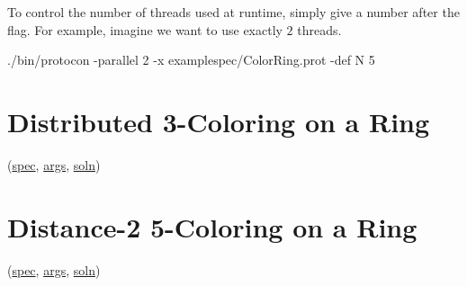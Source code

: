 To control the number of threads used at runtime, simply give a number after the  flag.
For example, imagine we want to use exactly $2$ threads.

\begin{code}
./bin/protocon -parallel 2 -x examplespec/ColorRing.prot -def N 5
\end{code}

\section{Distributed 3-Coloring on a Ring}
\label{sec:ColorRingDistrib}

(\href{\examplespec/ColorRingDistrib.prot}{spec},
\href{\examplesett/ColorRingDistrib.args}{args},
\href{\examplesoln/ColorRingDistrib.prot}{soln})

\section{Distance-2 5-Coloring on a Ring}
\label{sec:ColorRingLocal}

(\href{\examplespec/ColorRingLocal.prot}{spec},
\href{\examplesett/ColorRingLocal.args}{args},
\href{\examplesoln/ColorRingLocal.prot}{soln})



